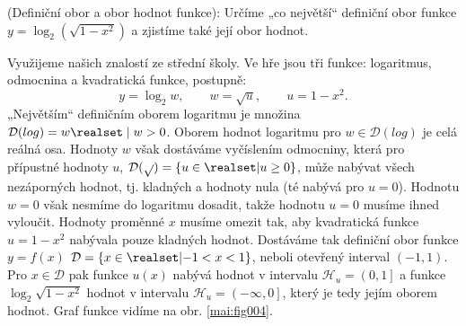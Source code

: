 \begin{mdframed}[style=mdexam]
  \begin{example}\label{mai:exam017}
    (Definiční obor a obor hodnot funkce): Určíme „co největší“ definiční obor funkce
    \(y=\log_2{(\sqrt{1-x^2})}\) a zjistíme také její obor hodnot.
        
    {\centering
    \captionsetup{type=figure}
    \par}
    
    Využijeme našich znalostí ze střední školy. Ve hře jsou tři funkce: logaritmus, odmocnina a
    kvadratická funkce, postupně: 
    \begin{equation*}
      y = \log_2w, \qquad w = \sqrt{u}, \qquad u = 1 - x^2.
    \end{equation*}
    „Největším“ definičním oborem logaritmu je množina \(\mathcal{D}(log) = {w\realset \mid w >
    0}\). Oborem hodnot logaritmu pro \(w \in \mathcal{D}(log)\) je celá reálná osa. Hodnoty \(w\)
    však dostáváme vyčíslením odmocniny, která pro přípustné hodnoty \(u\), \(\mathcal{D}(\sqrt{ })
    = \lbrace u\in\realset \lvert u\geq 0\rbrace\), může nabývat všech nezáporných hodnot, tj.
    kladných a hodnoty nula (té nabývá pro \(u = 0\)). Hodnotu \(w = 0\) však nesmíme do logaritmu
    dosadit, takže hodnotu \(u = 0\) musíme ihned vyloučit. Hodnoty proměnné \(x\) musíme omezit
    tak, aby kvadratická funkce \(u = 1 - x^2\) nabývala pouze kladných hodnot. Dostáváme tak
    definiční obor funkce \(y = f(x)\) \(\mathcal{D}=\lbrace x\in\realset \lvert -1<x<1\rbrace\),
    neboli otevřený interval \((-1, 1)\). Pro \(x \in \mathcal{D}\) pak funkce \(u(x)\) nabývá
    hodnot v intervalu \(\mathcal{H}_u = \left( 0, 1\right]\) a funkce \(\log_2\sqrt{1-x^2}\) hodnot
    v intervalu \(\mathcal{H}_u = \left( -\infty, 0\right]\), který je tedy jejím oborem hodnot.
    Graf funkce vidíme na obr. \ref{mai:fig004}. 
  \end{example}
\end{mdframed}